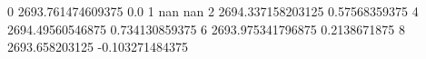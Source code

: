 0 2693.761474609375 0.0
1 nan nan
2 2694.337158203125 0.57568359375
4 2694.49560546875 0.734130859375
6 2693.975341796875 0.2138671875
8 2693.658203125 -0.103271484375
